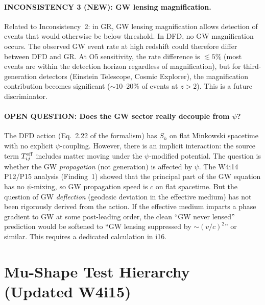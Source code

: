 \documentclass[11pt,a4paper]{article}
\begin{document}
\paragraph{INCONSISTENCY 3 (NEW): GW lensing magnification.}
Related to Inconsistency~2: in GR, GW lensing magnification allows
detection of events that would otherwise be below threshold.  In DFD,
no GW magnification occurs.  The observed GW event rate at high redshift
could therefore differ between DFD and GR.  At O5 sensitivity, the
rate difference is $\lesssim 5\%$ (most events are within the detection
horizon regardless of magnification), but for third-generation detectors
(Einstein Telescope, Cosmic Explorer), the magnification contribution
becomes significant ($\sim 10$--$20\%$ of events at $z > 2$).  This is
a future discriminator.

\paragraph{OPEN QUESTION: Does the GW sector really decouple from $\psi$?}
The DFD action (Eq.~2.22 of the formalism) has $S_h$ on flat Minkowski
spacetime with no explicit $\psi$-coupling.  However, there is an
implicit interaction: the source term $T_{ij}^{\rm eff}$ includes matter
moving under the $\psi$-modified potential.  The question is whether
the GW \emph{propagation} (not generation) is affected by $\psi$.  The
W4i14 P12/P15 analysis (Finding~1) showed that the principal part of
the GW equation has no $\psi$-mixing, so GW propagation speed is $c$
on flat spacetime.  But the question of GW \emph{deflection} (geodesic
deviation in the effective medium) has not been rigorously derived from
the action.  If the effective medium imparts a phase gradient to GW
at some post-leading order, the clean ``GW never lensed'' prediction
would be softened to ``GW lensing suppressed by $\sim (v/c)^2$'' or
similar.  This requires a dedicated calculation in i16.


\section{Mu-Shape Test Hierarchy (Updated W4i15)}
\end{document}
